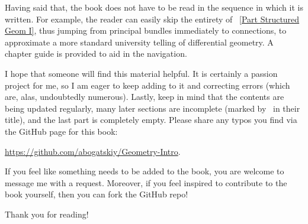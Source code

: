 Having said that, the book does not have to be read in the sequence in which it is written. For example, the reader can easily skip the entirety of \Part~\ref{Part Structured Geom I}, thus jumping from principal bundles immediately to connections, to approximate a more standard university telling of differential geometry. A chapter guide is provided to aid in the navigation.

I hope that someone will find this material helpful. It is certainly a passion project for me, so I am eager to keep adding to it and correcting errors (which are, alas, undoubtedly numerous). Lastly, keep in mind that the contents are being updated regularly, many later sections are incomplete (marked by \ucmark\ in their title), and the last part is completely empty. Please share any typos you find via the GitHub page for this book:
\begin{center}
    \url{https://github.com/abogatskiy/Geometry-Intro}.
\end{center}
If you feel like something needs to be added to the book, you are welcome to message me with a request. Moreover, if you feel inspired to contribute to the book yourself, then you can fork the GitHub repo! 

Thank you for reading!


